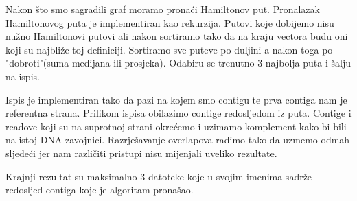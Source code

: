 Nakon što smo sagradili graf moramo pronaći Hamiltonov put. Pronalazak Hamiltonovog puta je implementiran kao rekurzija. Putovi koje dobijemo nisu nužno Hamiltonovi putovi ali nakon sortiramo tako da na kraju vectora budu oni koji su najbliže toj definiciji.  Sortiramo sve puteve po duljini a nakon toga po "dobroti"(suma medijana ili prosjeka). Odabiru se trenutno 3 najbolja puta i šalju na ispis. 


Ispis je implementiran tako da pazi na kojem smo contigu te prva contiga nam je referentna strana. Prilikom ispisa obilazimo contige redosljedom iz puta. Contige i readove koji su na suprotnoj strani okrećemo i uzimamo komplement kako bi bili na istoj DNA zavojnici. Razrješavanje overlapova radimo tako da uzmemo odmah sljedeći jer nam različiti pristupi nisu mijenjali uveliko rezultate.   


Krajnji rezultat su maksimalno 3 datoteke koje u svojim imenima sadrže redosljed contiga koje je algoritam pronašao. 




